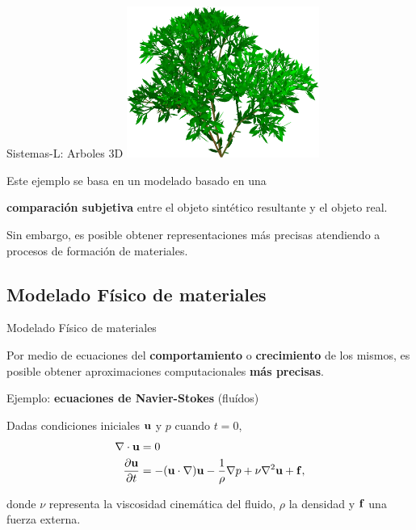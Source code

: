 \documentclass[spanish,unknownkeysallowed]{beamer}
\begin{document}
\begin{frame}{Sistemas-L: Arboles 3D}
\center
\includegraphics[width=6.3cm]{../figures/3dlsystem}

\end{frame}

\begin{frame}
Este ejemplo se basa en un modelado basado en una 

\textbf{comparación subjetiva} entre el objeto sintético resultante y el objeto real.

\vspace{1cm}

Sin embargo, es posible obtener representaciones más precisas atendiendo a procesos de formación de materiales.
\end{frame}

\subsection{Modelado Físico de materiales}

\begin{frame}{Modelado Físico de materiales}

Por medio de ecuaciones del \textbf{comportamiento} o \textbf{crecimiento} de los mismos, es posible obtener aproximaciones computacionales \textbf{más precisas}.

Ejemplo: \textbf{ecuaciones de Navier-Stokes} (fluídos)

Dadas condiciones iniciales $\bold{u}$ y $p$ cuando $t = 0$,
\begin{align*}
\nabla \cdot \bold{u} &= 0\\
\frac{\partial \bold{u} }{\partial t} &= - (\bold{u} \cdot \nabla) \bold{u} - \frac{1}{\rho} \nabla p + \nu \nabla^{2} \bold{u} + \bold{f},
\end{align*}

\noindent donde $\nu$ representa la viscosidad cinemática del fluido, $\rho$ la densidad y $\bold{f}$ una fuerza externa.

\end{frame}
\end{document}
